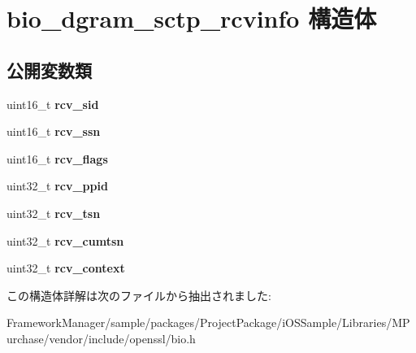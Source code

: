 \hypertarget{structbio__dgram__sctp__rcvinfo}{}\section{bio\+\_\+dgram\+\_\+sctp\+\_\+rcvinfo 構造体}
\label{structbio__dgram__sctp__rcvinfo}
\subsection*{公開変数類}
\begin{DoxyCompactItemize}
\item 
\hypertarget{structbio__dgram__sctp__rcvinfo_aaddad1a5b0f7b5fda8a0aeb8e5a6c63d}{}uint16\+\_\+t {\bfseries rcv\+\_\+sid}\label{structbio__dgram__sctp__rcvinfo_aaddad1a5b0f7b5fda8a0aeb8e5a6c63d}

\item 
\hypertarget{structbio__dgram__sctp__rcvinfo_a9cac7bdaa73e1d948a9485a5edd265ca}{}uint16\+\_\+t {\bfseries rcv\+\_\+ssn}\label{structbio__dgram__sctp__rcvinfo_a9cac7bdaa73e1d948a9485a5edd265ca}

\item 
\hypertarget{structbio__dgram__sctp__rcvinfo_abfd14b07964648d311e581a5666d19b6}{}uint16\+\_\+t {\bfseries rcv\+\_\+flags}\label{structbio__dgram__sctp__rcvinfo_abfd14b07964648d311e581a5666d19b6}

\item 
\hypertarget{structbio__dgram__sctp__rcvinfo_a3ee7d864acf357f8165e8b988d6d8f54}{}uint32\+\_\+t {\bfseries rcv\+\_\+ppid}\label{structbio__dgram__sctp__rcvinfo_a3ee7d864acf357f8165e8b988d6d8f54}

\item 
\hypertarget{structbio__dgram__sctp__rcvinfo_adee218bef23543691b93d3e665a7e158}{}uint32\+\_\+t {\bfseries rcv\+\_\+tsn}\label{structbio__dgram__sctp__rcvinfo_adee218bef23543691b93d3e665a7e158}

\item 
\hypertarget{structbio__dgram__sctp__rcvinfo_a6bfc2bacc606356cfdf1c00c71b2227e}{}uint32\+\_\+t {\bfseries rcv\+\_\+cumtsn}\label{structbio__dgram__sctp__rcvinfo_a6bfc2bacc606356cfdf1c00c71b2227e}

\item 
\hypertarget{structbio__dgram__sctp__rcvinfo_aed041b41dfccd0bbb626d34cf03b36cb}{}uint32\+\_\+t {\bfseries rcv\+\_\+context}\label{structbio__dgram__sctp__rcvinfo_aed041b41dfccd0bbb626d34cf03b36cb}

\end{DoxyCompactItemize}


この構造体詳解は次のファイルから抽出されました\+:\begin{DoxyCompactItemize}
\item 
Framework\+Manager/sample/packages/\+Project\+Package/i\+O\+S\+Sample/\+Libraries/\+M\+Purchase/vendor/include/openssl/bio.\+h\end{DoxyCompactItemize}
